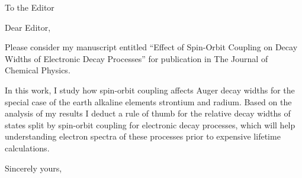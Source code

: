 \documentclass[DIN,pagenumber=false,parskip=half,fromalign=left,fromphone=false,fromemail=true,fromurl=false,fromlogo=false,fromrule=false]{scrlttr2}
\begin{document}
\begin{letter}{To the Editor}
	
	\opening{Dear Editor,}

Please consider my manuscript entitled ``Effect of Spin-Orbit Coupling on
Decay Widths of Electronic Decay Processes'' for publication in The Journal
of Chemical Physics.

In this work, I study how spin-orbit coupling affects Auger decay widths
for the special case of the earth alkaline elements strontium and radium.
Based on the analysis of my results I deduct a rule of thumb for the
relative decay widths of states split by spin-orbit coupling for electronic
decay processes, which will help understanding electron spectra of these
processes prior to expensive lifetime calculations.


        \closing{Sincerely yours,}
	\end{letter}
\end{document}
